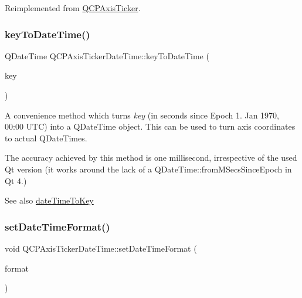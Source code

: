Reimplemented from \mbox{\hyperlink{class_q_c_p_axis_ticker_a910d69bcec2de37e92d8d4e1ecf201e2}{Q\+C\+P\+Axis\+Ticker}}.

\mbox{\label{class_q_c_p_axis_ticker_date_time_a4c1761ad057f5564804a53f942629b53}} 
\subsubsection{\texorpdfstring{keyToDateTime()}{keyToDateTime()}}
{\footnotesize\ttfamily Q\+Date\+Time Q\+C\+P\+Axis\+Ticker\+Date\+Time\+::key\+To\+Date\+Time (\begin{DoxyParamCaption}\item[{double}]{key }\end{DoxyParamCaption})\hspace{0.3cm}{\ttfamily [static]}}

A convenience method which turns {\itshape key} (in seconds since Epoch 1. Jan 1970, 00\+:00 U\+TC) into a Q\+Date\+Time object. This can be used to turn axis coordinates to actual Q\+Date\+Times.

The accuracy achieved by this method is one millisecond, irrespective of the used Qt version (it works around the lack of a Q\+Date\+Time\+::from\+M\+Secs\+Since\+Epoch in Qt 4.)

\begin{DoxySeeAlso}{See also}
\mbox{\hyperlink{class_q_c_p_axis_ticker_date_time_aa24f293f16fff0f937bf71f4140033f1}{date\+Time\+To\+Key}} 
\end{DoxySeeAlso}
\mbox{\label{class_q_c_p_axis_ticker_date_time_ad52660a82f688395468674d555f6a86b}} 
\subsubsection{\texorpdfstring{setDateTimeFormat()}{setDateTimeFormat()}}
{\footnotesize\ttfamily void Q\+C\+P\+Axis\+Ticker\+Date\+Time\+::set\+Date\+Time\+Format (\begin{DoxyParamCaption}\item[{const Q\+String \&}]{format }\end{DoxyParamCaption})}


